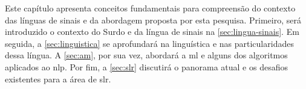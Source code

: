 Este capítulo apresenta conceitos fundamentais para compreensão do contexto das línguas de sinais e da abordagem proposta por esta pesquisa.
Primeiro, será introduzido o contexto do Surdo e da língua de sinais na \autoref{sec:lingua-sinais}.
Em seguida, a \autoref{sec:linguistica} se aprofundará na linguística e nas particularidades dessa língua.
A \autoref{sec:am}, por sua vez, abordará a \acrlong{ml} e alguns dos algoritmos aplicados ao \acrlong{nlp}.
Por fim, a \autoref{sec:slr} discutirá o panorama atual e os desafios existentes para a área de \acrlong{slr}.
